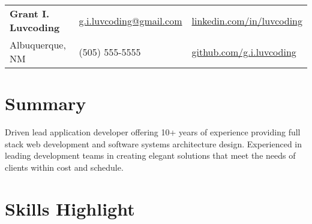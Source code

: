 




\begin{tabu} to \textwidth { X[l] X[c] X[r] }
    \textbf{\large Grant I. Luvcoding}   & \href{mailto:g.i.luvcoding@gmail.com}{g.i.luvcoding@gmail.com} & \href{https://www.linkedin.com/in/luvcoding}{linkedin.com/in/luvcoding}   \\
    Albuquerque, NM & (505) 555-5555 & \href{https://www.github.com/g.i.luvcoding}{github.com/g.i.luvcoding}
\end{tabu}


\vspace{-1ex}
\section{Summary}

\SubHeadingListBegin

    \Summary
        {Driven lead application developer offering 10+ years of experience providing full stack web development and software systems architecture design. Experienced in leading development teams in creating elegant solutions that meet the needs of clients within cost and schedule.}

\SubHeadingListEnd


\section{Skills Highlight}

\vspace{-1em}
\SubHeadingListBegin

    \SkillsListBegin
    \SkillsListEnd

